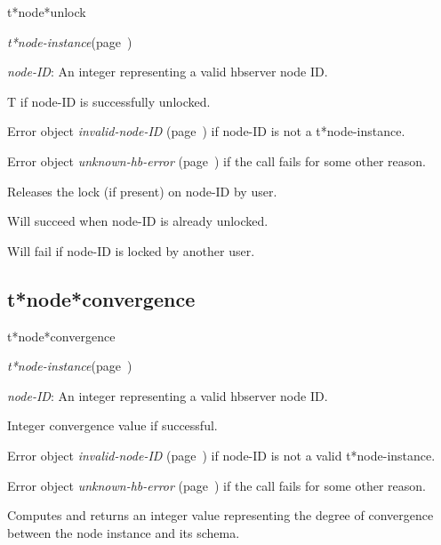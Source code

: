 \begin{description}
\item [Name:]  t*node*unlock

\item [Class:] {\sl t*node-instance}\hfill(page~\pageref{t*node-instance})

\item [Parameters:]
\item {\sl node-ID}:   An integer representing
a valid hbserver node ID.


\item [Return-value:] 
T if node-ID is successfully unlocked.

Error object {\sl invalid-node-ID} (page~\pageref{invalid-node-ID}) if node-ID is
not a t*node-instance.

Error object {\sl unknown-hb-error} (page~\pageref{unknown-hb-error}) if the call
fails for some other reason.

\item [Description:]

Releases the lock (if present) on node-ID by user.

Will succeed when node-ID is already unlocked.

Will fail if node-ID is locked by another user.


\item [Public:]



\end{description}
\horizontalline

\subsection{t*node*convergence}
\label{t*node*convergence}

\begin{description}
\item [Name:]  t*node*convergence

\item [Class:] {\sl t*node-instance}\hfill(page~\pageref{t*node-instance})

\item [Parameters:]
\item {\sl node-ID}:   An integer representing
a valid hbserver node ID.


\item [Return-value:] 
Integer convergence value if successful.

Error object {\sl invalid-node-ID} (page~\pageref{invalid-node-ID}) if node-ID is not a 
valid t*node-instance.

Error object {\sl unknown-hb-error} (page~\pageref{unknown-hb-error}) if the call fails
for some other reason.

\item [Description:]

Computes and returns an integer value representing 
the degree of convergence between the node
instance and its schema.

\item [Public:]



\end{description}
\horizontalline


